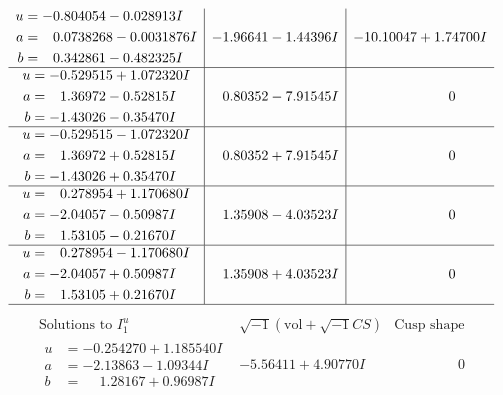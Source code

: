 \documentclass[1p]{elsarticle_modified}
\theoremstyle{definition}
\newcommand{\I}{\sqrt{-1}}
\begin{document}
$$\begin{array}{c|c|c}
\begin{aligned}
u &= -0.804054 - 0.028913 I \\
a &= \phantom{-}0.0738268 - 0.0031876 I \\
b &= \phantom{-}0.342861 - 0.482325 I\end{aligned}
 & -1.96641 - 1.44396 I & -10.10047 + 1.74700 I \\ \hline\begin{aligned}
u &= -0.529515 + 1.072320 I \\
a &= \phantom{-}1.36972 - 0.52815 I \\
b &= -1.43026 - 0.35470 I\end{aligned}
 & \phantom{-}0.80352 - 7.91545 I & \phantom{-0.000000 } 0 \\ \hline\begin{aligned}
u &= -0.529515 - 1.072320 I \\
a &= \phantom{-}1.36972 + 0.52815 I \\
b &= -1.43026 + 0.35470 I\end{aligned}
 & \phantom{-}0.80352 + 7.91545 I & \phantom{-0.000000 } 0 \\ \hline\begin{aligned}
u &= \phantom{-}0.278954 + 1.170680 I \\
a &= -2.04057 - 0.50987 I \\
b &= \phantom{-}1.53105 - 0.21670 I\end{aligned}
 & \phantom{-}1.35908 - 4.03523 I & \phantom{-0.000000 } 0 \\ \hline\begin{aligned}
u &= \phantom{-}0.278954 - 1.170680 I \\
a &= -2.04057 + 0.50987 I \\
b &= \phantom{-}1.53105 + 0.21670 I\end{aligned}
 & \phantom{-}1.35908 + 4.03523 I & \phantom{-0.000000 } 0\\
 \hline 
 \end{array}$$\newpage$$\begin{array}{c|c|c}  
\text{Solutions to }I^u_{1}& \I (\text{vol} + \sqrt{-1}CS) & \text{Cusp shape}\\
 \hline 
\begin{aligned}
u &= -0.254270 + 1.185540 I \\
a &= -2.13863 - 1.09344 I \\
b &= \phantom{-}1.28167 + 0.96987 I\end{aligned}
 & -5.56411 + 4.90770 I & \phantom{-0.000000 } 0 \\ \hline\begin{aligned}

\end{aligned}
\end{array}$$
\end{document}
